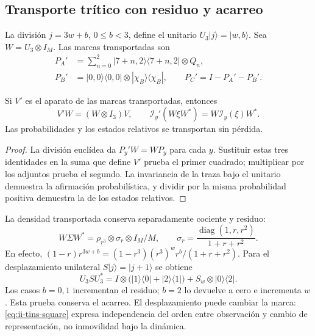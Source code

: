 \subsection{Transporte trítico con residuo y acarreo}
\label{subsec:ii-tins-tritico}

La división $j=3w+b$, $0\le b<3$, define el unitario
$U_3|j\rangle=|w,b\rangle$. Sea $W=U_3\otimes I_M$. Las marcas transportadas son
\begin{align}
 P_A'&=\sum_{n=0}^2|7+n,2\rangle\langle7+n,2|\otimes Q_n,\nonumber\\
 P_B'&=|0,0\rangle\langle0,0|\otimes|\chi_B\rangle\langle \chi_B|,
 \qquad P_C'=I-P_A'-P_B'.
 \label{eq:ii-tins-tritic-marks}
\end{align}

\begin{proposition}
\label{prop:ii-tins-tritic}
Si $V'$ es el aparato de las marcas transportadas, entonces
\begin{equation}
 V'W=(W\otimes I_3)V,\qquad
 \mathcal I_y'(W\xi W^*)=W\mathcal I_y(\xi)W^*.
 \label{eq:ii-tins-square}
\end{equation}
Las probabilidades y los estados relativos se transportan sin pérdida.
\end{proposition}
\begin{proof}
La división euclídea da $P_y'W=WP_y$ para cada $y$. Sustituir estas
tres identidades en la suma que define $V'$ prueba el primer cuadrado;
multiplicar por los adjuntos prueba el segundo. La invariancia de la traza
bajo el unitario demuestra la afirmación probabilística, y dividir por
la misma probabilidad positiva demuestra la de los estados relativos.
\end{proof}

La densidad transportada conserva separadamente cociente y residuo:
\begin{equation}
 W\Sigma W^*=\rho_{r^3}\otimes\sigma_r\otimes I_M/M,
 \qquad \sigma_r=\frac{\operatorname{diag}(1,r,r^2)}{1+r+r^2}.
 \label{eq:ii-tins-tritic-state}
\end{equation}
En efecto, $(1-r)r^{3w+b}=(1-r^3)(r^3)^w r^b/(1+r+r^2)$.
Para el desplazamiento unilateral $S|j\rangle=|j+1\rangle$ se obtiene
\begin{equation}
 U_3SU_3^*=I\otimes\bigl(|1\rangle\langle0|+|2\rangle\langle1|\bigr)
 +S_w\otimes|0\rangle\langle2|.
 \label{eq:ii-tins-carry}
\end{equation}
Los casos $b=0,1$ incrementan el residuo; $b=2$ lo devuelve a cero e
incrementa $w$. Esta prueba conserva el acarreo. El desplazamiento puede
cambiar la marca: \eqref{eq:ii-tins-square} expresa independencia del orden
entre observación y cambio de representación, no inmovilidad bajo la dinámica.

